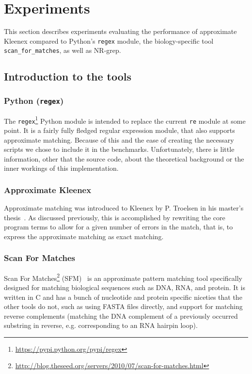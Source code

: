\section{Experiments}

This section describes experiments evaluating the performance of approximate
Kleenex compared to Python's \texttt{regex} module, the biology-specific tool
\texttt{scan\_for\_matches}, as well as NR-grep.

\subsection{Introduction to the tools}
\subsubsection{Python (\texttt{regex})}
The \texttt{regex}\footnote{\url{https://pypi.python.org/pypi/regex}} Python
module is intended to replace the current \texttt{re} module at some point. It
is a fairly fully fledged regular expression module, that also supports
approximate matching. Because of this and the ease of creating the necessary
scripts we chose to include it in the benchmarks. Unfortunately, there is
little information, other that the source code, about the theoretical
background or the inner workings of this implementation.

\subsubsection{Approximate Kleenex}
Approximate matching was introduced to Kleenex by P. Troelsen in his master's
thesis~\cite{troelsen2016approximate}. As discussed previously, this is
accomplished by rewriting the core program terms to allow for a given number of
errors in the match, that is, to express the approximate matching as exact
matching.

\subsubsection{Scan For Matches}
Scan For Matches\footnote{\url{http://blog.theseed.org/servers/2010/07/scan-for-matches.html}}
(SFM)~\cite{dsouza1997searching} is an approximate pattern matching tool
specifically designed for matching biological sequences such as DNA, RNA, and
protein. It is written in C and has a bunch of nucleotide and protein specific
niceties that the other tools do not, such as using FASTA files directly, and
support for matching reverse complements (matching the DNA complement of a
previously occurred substring in reverse, e.g. corresponding to an RNA hairpin
loop).

